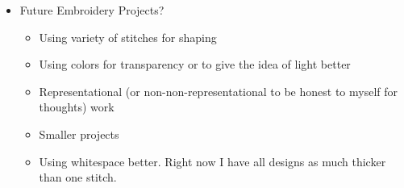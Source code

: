 \documentclass[12pt]{article}
\renewcommand{\,}{\textsuperscript{,}}
\begin{document}
\begin{itemize}
\begin{itemize}
\begin{itemize}
\begin{itemize}
 \item Full design  
 \begin{itemize}  
 \item Figure out how many colors of thread I'm going to buy and how much of each. Current thoughts:  
 \begin{itemize}   
 \item Need six colors for the knot   
 \item I think that I want to have one color for the weave, though that may end up being one mixed-color color.\footnote{e.g. Gold and green}   
 \item Figure out how many colors for the background.\footnote{Still leaning towards some sort of gradient but need to make it work with the rainbow.}   
 \end{itemize}  
 \item Figure out how all three layers all looks together.

That is, take the full stitch design for the knot and add the stitches for the weave and background underneath.  
 \item Figure out action plan for stitching. \\ See \href{daily-reflection-2026-08-03}{this post} for most recent ideas.  
 \end{itemize}  
   
 \item Stitching: do. \\ See \href{daily-reflection-2026-08-03}{this post} for most recent ideas.

\end{itemize}  
 \end{itemize}  
 \item Future Embroidery Projects?  
 \begin{itemize}   
 \item Using variety of stitches for shaping   
 \item Using colors for transparency or to give the idea of light better   
 \item Representational (or non-non-representational to be honest to myself for thoughts) work   
 \item Smaller projects   
 \item Using whitespace better. Right now I have all designs as much thicker than one stitch.   
   

\end{itemize}
\end{itemize}
\end{itemize}
\end{document}
